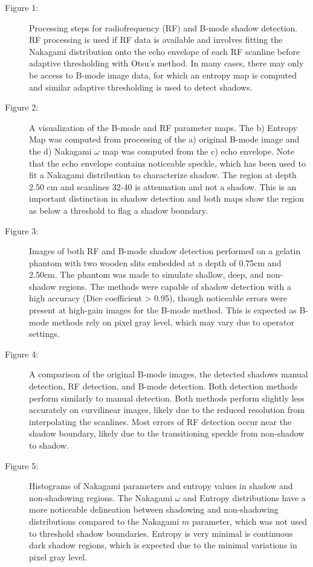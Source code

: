 \documentclass[authoryear,preprint,review,12pt]{elsarticle}
\begin{document}
\begin{description}
\item[Figure 1:] Processing steps for radiofrequency (RF) and B-mode shadow detection. RF processing is used if RF data is available and involves fitting the Nakagami distribution onto the echo envelope of each RF scanline before adaptive thresholding with Otsu’s method. In many cases, there may only be access to B-mode image data, for which an entropy map is computed and similar adaptive thresholding is used to detect shadows.
\item[Figure 2:] A visualization of the B-mode and RF parameter maps. The b) Entropy Map was computed from processing of the a) original B-mode image and the d) Nakagami $\omega$ map was computed from the c) echo envelope. Note that the echo envelope contains noticeable speckle, which has been used to fit a Nakagami distribution to characterize shadow. The region at depth 2.50 cm and scanlines 32-40 is attenuation and not a shadow. This is an important distinction in shadow detection and both maps show the region as below a threshold to flag a shadow boundary. 
\item[Figure 3:] Images of both RF and B-mode shadow detection performed on a gelatin phantom with two wooden slits embedded at a depth of 0.75cm and 2.50cm. The phantom was made to simulate shallow, deep, and non-shadow regions. The methods were capable of shadow detection with a high accuracy (Dice coefficient > 0.95), though noticeable errors were present at high-gain images for the B-mode method. This is expected as B-mode methods rely on pixel gray level, which may vary due to operator settings.
\item[Figure 4:] A comparison of the original B-mode images, the detected shadows manual detection, RF detection, and B-mode detection. Both detection methods perform similarly to manual detection. Both methods perform slightly less accurately on curvilinear images, likely due to the reduced resolution from interpolating the scanlines. Most errors of RF detection occur near the shadow boundary, likely due to the transitioning speckle from non-shadow to shadow.
\item[Figure 5:] Histograms of Nakagami parameters and entropy values in shadow and non-shadowing regions. The Nakagami $\omega$ and Entropy distributions have a more noticeable delineation between shadowing and non-shadowing distributions compared to the Nakagami $m$ parameter, which was not used to threshold shadow boundaries. Entropy is very minimal is continuous dark shadow regions, which is expected due to the minimal variations in pixel gray level. 
\end{description}
\end{document}
